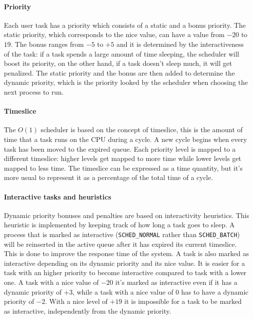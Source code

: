 \paragraph{Priority} %
Each user task has a priority which consists of a static and a bonus priority. The static priority, which corresponds to the nice value, can have a value from $-20$ to $19$. The bonus ranges from $-5$ to $+5$ and it is determined by the interactiveness of the task: if a task spends a large amount of time sleeping, the scheduler will boost its priority, on the other hand, if a task doesn't sleep much, it will get penalized. 
The static priority and the bonus are then added to determine the dynamic priority, which is the priority looked by the scheduler when choosing the next process to run.

\paragraph{Timeslice} %
The $O(1)$ scheduler is based on the concept of timeslice, this is the amount of time that a task runs on the CPU during a cycle. A new cycle begins when every task has been moved to the expired queue. Each priority level is mapped to a different timeslice: higher levels get mapped to more time while lower levels get mapped to less time. The timeslice can be expressed as a time quantity, but it's more usual to represent it as a percentage of the total time of a cycle.

\paragraph{Interactive tasks and heuristics} 
Dynamic priority bonuses and penalties are based on interactivity heuristics. This heuristic is implemented by keeping track of how long a task goes to sleep.\cite{O(1)}
A process that is marked as interactive (\verb|SCHED_NORMAL| rather than \verb|SCHED_BATCH|) will be reinserted in the
active queue after it has expired its current timeslice. This is done 
to improve the response time of the system. A task is
also marked as interactive depending on its dynamic priority and its nice
value. It is easier for a task with an higher priority to become interactive compared to task with a lower one. A task with a nice value of $-20$ it's marked as interactive
even if it has a dynamic priority of $+3$, while a task with a nice
value of $0$ has to have a dynamic priority of $-2$. With a nice level
of $+19$ it is impossible for a task to be marked as interactive, independently from the dynamic priority. %

